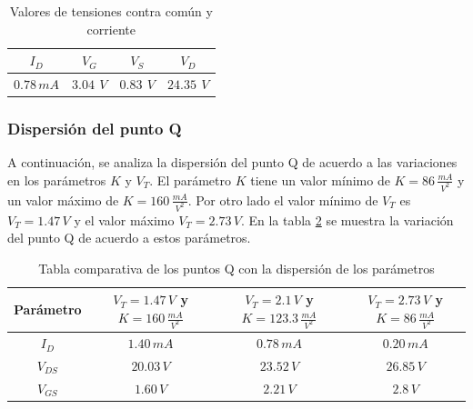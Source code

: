 \documentclass[10pt,spanish,a4paper,notitlepage]{article}
\begin{document}
\begin{table}[H]
    \centering
    \begin{tabular}{|c|c|c|c|} %
    \hline
    $I_D$ & $V_{G}$ & $V_{S}$ & $V_{D}$ \\ \hline
     $0.78\,\unit{mA}$ & $3.04\,\unit{\ V}$  & $0.83\,\unit{\ V}$  & $24.35\,\unit{\ V}$  \\ \hline
    \end{tabular}
    \caption{Valores de tensiones contra común y corriente}
    \label{table:tabla_Q}
    \end{table}

\subsubsection{Dispersión del punto Q}

A continuación, se analiza la dispersión del punto Q de acuerdo a las variaciones en los parámetros $K$ y $V_T$. El parámetro $K$ tiene un valor mínimo de $K=86\,\unit{\frac{mA}{V^2}}$ y un valor máximo de $K=160\,\unit{\frac{mA}{V^2}}$. Por otro lado el valor mínimo de $V_T$ es $V_T=1.47\,\unit{V}$ y el valor máximo $V_T=2.73\,\unit{V}$. En la tabla \ref{table:tabla_dispQ} se muestra la variación del punto Q de acuerdo a estos parámetros.

\begin{table}[H]
    \centering
    \begin{tabular}{|c|c|c|c|} %
    \hline
    Parámetro & $V_{T}=1.47\,\unit{V}$ y $K=160\,\unit{\frac{mA}{V^2}}$ & $V_T=2.1\,\unit{V}$ y $K=123.3\,\unit{\frac{mA}{V^2}}$ & $V_{T}=2.73\,\unit{V}$ y $K=86\,\unit{\frac{mA}{V^2}}$  \\ \hline
    $I_D$ & $1.40\,\unit{mA}$ & $0.78\,\unit{mA}$ & $0.20\,\unit{mA}$   \\ \hline
    $V_{DS}$ & $20.03\,\unit{V}$  & $23.52\,\unit{V}$ &  $26.85\,\unit{V}$  \\ \hline
    $V_{GS}$ & $1.60\,\unit{V}$ & $2.21\,\unit{V}$ & $2.8\,\unit{V}$  \\ \hline
    \end{tabular}
    \caption{Tabla comparativa de los puntos Q con la dispersión de los parámetros }
    \label{table:tabla_dispQ}
    \end{table}
\end{document}
